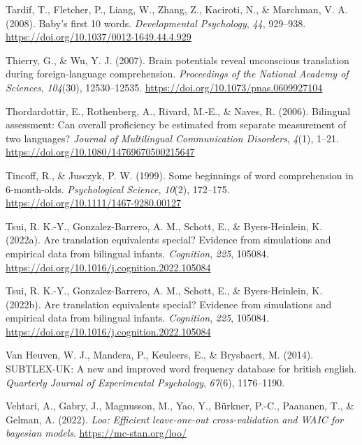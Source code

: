 \documentclass[
  man,
  floatsintext,
  colorlinks=true,linkcolor=blue,citecolor=blue,urlcolor=blue,biblatex]{apa7}
\newlength{\cslhangindent}
\newlength{\cslentryspacingunit} %
\newenvironment{CSLReferences}[2] %
 {%
  \setlength{\parindent}{0pt}
  \ifodd #1
  \let\oldpar\par
  \def\par{\hangindent=\cslhangindent\oldpar}
  \fi
  \setlength{\parskip}{#2\cslentryspacingunit}
 }%
 {}
\begin{document}
\begin{CSLReferences}{1}{0}
\leavevmode{}%
Tardif, T., Fletcher, P., Liang, W., Zhang, Z., Kaciroti, N., \&
Marchman, V. A. (2008). Baby's first 10 words. \emph{Developmental
Psychology}, \emph{44}, 929--938.
\url{https://doi.org/10.1037/0012-1649.44.4.929}

\leavevmode{}%
Thierry, G., \& Wu, Y. J. (2007). Brain potentials reveal unconscious
translation during foreign-language comprehension. \emph{Proceedings of
the National Academy of Sciences}, \emph{104}(30), 12530--12535.
\url{https://doi.org/10.1073/pnas.0609927104}

\leavevmode{}%
Thordardottir, E., Rothenberg, A., Rivard, M.-E., \& Naves, R. (2006).
Bilingual assessment: Can overall proficiency be estimated from separate
measurement of two languages? \emph{Journal of Multilingual
Communication Disorders}, \emph{4}(1), 1--21.
\url{https://doi.org/10.1080/14769670500215647}

\leavevmode{}%
Tincoff, R., \& Jusczyk, P. W. (1999). Some beginnings of word
comprehension in 6-month-olds. \emph{Psychological Science},
\emph{10}(2), 172--175. \url{https://doi.org/10.1111/1467-9280.00127}

\leavevmode{}%
Tsui, R. K.-Y., Gonzalez-Barrero, A. M., Schott, E., \& Byers-Heinlein,
K. (2022a). Are translation equivalents special? Evidence from
simulations and empirical data from bilingual infants. \emph{Cognition},
\emph{225}, 105084.
\url{https://doi.org/10.1016/j.cognition.2022.105084}

\leavevmode{}%
Tsui, R. K.-Y., Gonzalez-Barrero, A. M., Schott, E., \& Byers-Heinlein,
K. (2022b). Are translation equivalents special? Evidence from
simulations and empirical data from bilingual infants. \emph{Cognition},
\emph{225}, 105084.
\url{https://doi.org/10.1016/j.cognition.2022.105084}

\leavevmode{}%
Van Heuven, W. J., Mandera, P., Keuleers, E., \& Brysbaert, M. (2014).
{SUBTLEX}-{UK}: A new and improved word frequency database for british
english. \emph{Quarterly Journal of Experimental Psychology},
\emph{67}(6), 1176--1190.

\leavevmode{}%
Vehtari, A., Gabry, J., Magnusson, M., Yao, Y., Bürkner, P.-C.,
Paananen, T., \& Gelman, A. (2022). \emph{Loo: Efficient leave-one-out
cross-validation and {WAIC} for bayesian models}.
\url{https://mc-stan.org/loo/}


\end{CSLReferences}
\end{document}
